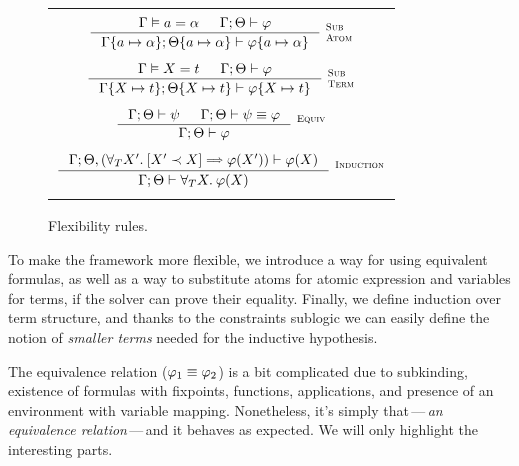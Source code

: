 \documentclass[english, mgr]{iithesis}
\renewcommand{\it}[1]{\textit{#1}}
\newcommand{\scbrk}[2]{\myatop{\textsc{#1}}{\textsc{#2}}}
\newcommand{\mdash}{\,---\,}
\def\-{{\mdash}}
\begin{document}
\begin{figure}[htbp]
\centering
\begin{tabularx}{\textwidth}{|C|}
  \hline \\
$
  \inference{
    \cjgmnt[\cEnv]{\atomv \ceq \atomexp} &
    \jgmnt[\cEnv;\Theta]{\formphi}
    }{
    \jgmnt[\cEnv\{\atomv \mapsto \atomexp\};\Theta\{\atomv \mapsto \atomexp\}]{\formphi\{\atomv \mapsto \atomexp\}}
  }\:\scbrk{Sub}{Atom}
$ \\ \\ $
  \inference{
    \cjgmnt[\cEnv]{\termv \ceq \term} &
    \jgmnt[\cEnv;\Theta]{\formphi}
    }{
    \jgmnt[\cEnv\{\termv \mapsto \term\};\Theta\{\termv \mapsto \term\}]{\formphi\{\termv \mapsto \term\}}
  }\:\scbrk{Sub}{Term}
$ \\ \\ $
  \inference{
    \jgmnt[\cEnv;\Theta]{\psi} &
    \jgmnt[\cEnv;\Theta]{\psi \equiv \formphi}
    }{
    \jgmnt[\cEnv;\Theta]{\formphi}
  }\:\scbrk{Equiv}{}
$ \\ \\ $
  \inference{
    \jgmnt[\cEnv;\Theta, (\fForallTerm{\termv'} \fCImp{\termv' \cshlt \termv} \formphi(\termv'))]{\formphi(\termv)}
    }{
    \jgmnt[\cEnv;\Theta]{\fForallTerm{\termv} \formphi(\termv)}
  }\:\scbrk{Induction}{}
  $ \\ \\ \hline
\end{tabularx}
\caption{Flexibility rules.}
\label{fig:flexibility}
\end{figure}
To make the framework more flexible, we introduce a way for using equivalent formulas, as well as a way to substitute atoms for atomic expression and variables for terms, if the solver can prove their equality. Finally, we define induction over term structure,
and thanks to the constraints sublogic we can easily define the notion of
\it{smaller terms} needed for the inductive hypothesis.

The equivalence relation ($\varphi_1 \equiv \varphi_2$) is a bit complicated
due to subkinding, existence of formulas
with fixpoints, functions, applications,
and presence of an environment with variable mapping.
Nonetheless, it's simply that\-\it{an equivalence relation}\-and it
behaves as expected. We will only highlight the interesting parts.
\end{document}
